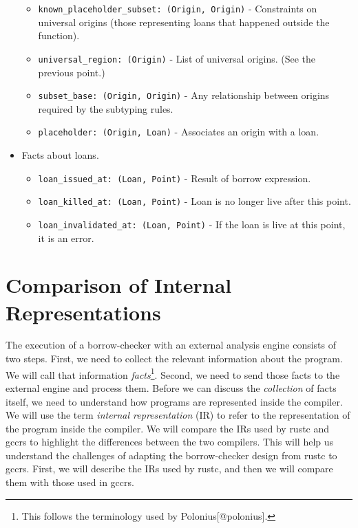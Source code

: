 \documentclass[
  11pt,
]{report}
\providecommand{\tightlist}{%
  \setlength{\itemsep}{0pt}\setlength{\parskip}{0pt}}
\begin{document}
\begin{itemize}
  \begin{itemize}
  \tightlist
  \item
    \texttt{known\_placeholder\_subset:\ (Origin,\ Origin)} -
    Constraints on universal origins (those representing loans that
    happened outside the function).
  \item
    \texttt{universal\_region:\ (Origin)} - List of universal origins.
    (See the previous point.)
  \item
    \texttt{subset\_base:\ (Origin,\ Origin)} - Any relationship between
    origins required by the subtyping rules.
  \item
    \texttt{placeholder:\ (Origin,\ Loan)} - Associates an origin with a
    loan.
  \end{itemize}
\item
  Facts about loans.

  \begin{itemize}
  \tightlist
  \item
    \texttt{loan\_issued\_at:\ (Loan,\ Point)} - Result of borrow
    expression.
  \item
    \texttt{loan\_killed\_at:\ (Loan,\ Point)} - Loan is no longer live
    after this point.
  \item
    \texttt{loan\_invalidated\_at:\ (Loan,\ Point)} - If the loan is
    live at this point, it is an error.
  \end{itemize}
\end{itemize}

\chapter{Comparison of Internal
Representations}\label{comparison-of-internal-representations}

The execution of a borrow-checker with an external analysis engine
consists of two steps. First, we need to collect the relevant
information about the program. We will call that information
\emph{facts}\footnote{This follows the terminology used by
  Polonius{[}@polonius{]}.}. Second, we need to send those facts to the
external engine and process them. Before we can discuss the
\emph{collection} of facts itself, we need to understand how programs
are represented inside the compiler. We will use the term \emph{internal
representation} (IR) to refer to the representation of the program
inside the compiler. We will compare the IRs used by rustc and gccrs to
highlight the differences between the two compilers. This will help us
understand the challenges of adapting the borrow-checker design from
rustc to gccrs. First, we will describe the IRs used by rustc, and then
we will compare them with those used in gccrs.
\end{document}
